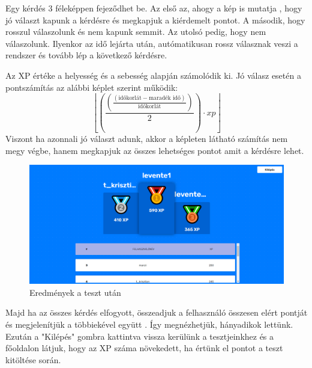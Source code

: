 Egy kérdés 3 féleképpen fejeződhet be. Az első az, ahogy a kép is mutatja , hogy jó választ kapunk a kérdésre és megkapjuk a kiérdemelt pontot. A második, hogy rosszul válaszolunk és nem kapunk semmit. Az utolsó pedig, hogy nem válaszolunk. Ilyenkor az idő lejárta után, autómatikusan rossz válasznak veszi a rendszer és tovább lép a következő kérdésre. \newline

Az XP értéke a helyesség és a sebesség alapján számolódik ki.
Jó válasz esetén a pontszámítás az alábbi képlet szerint működik:
\[ \left\lfloor\left(\frac{\left(\frac{\left( \text{időkorlát} - \text{maradék idő}\right)}{ \text{időkorlát}}\right)}{2}\right)\cdot xp\right\rfloor \]
Viszont ha azonnali jó választ adunk, akkor a képleten látható számítás nem megy végbe, hanem megkapjuk az összes lehetséges pontot amit a kérdésre lehet.

\begin{figure}[H]
    \centering
    \includegraphics[width=\linewidth]{images/results.png}
    \caption{Eredmények a teszt után}
    \label{fig:results}
\end{figure}

Majd ha az összes kérdés elfogyott, összeadjuk a felhasználó összesen elért pontját és megjelenítjük a többiekével együtt . Így megnézhetjük, hányadikok lettünk. Ezután a "Kilépés" gombra kattintva vissza kerülünk a tesztjeinkhez és a főoldalon látjuk, hogy az XP száma növekedett, ha értünk el pontot a teszt kitöltése során.